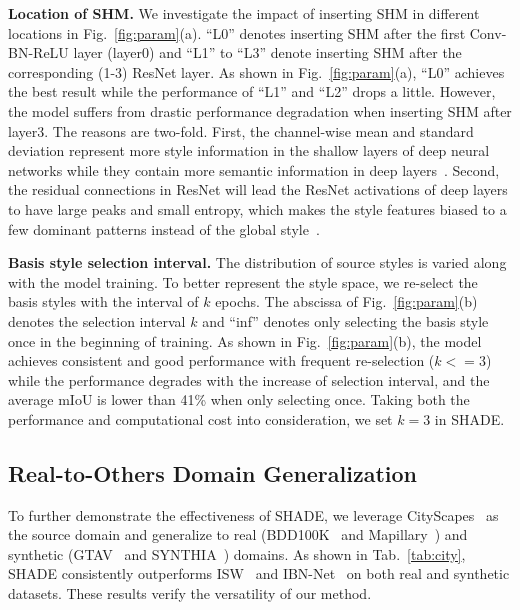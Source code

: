 \documentclass[runningheads]{llncs}
\newcommand{\ours}{SHADE\xspace}
\begin{document}
\noindent\textbf{Location of SHM.}
We investigate the impact of inserting SHM in different locations in Fig.~\ref{fig:param}(a). ``L0'' denotes inserting SHM after the first Conv-BN-ReLU layer (layer0) and ``L1'' to ``L3'' denote inserting SHM after the corresponding (1-3) ResNet layer. As shown in Fig.~\ref{fig:param}(a), ``L0'' achieves the best result while the performance of ``L1'' and ``L2'' drops a little. However, the model suffers from drastic performance degradation when inserting SHM after layer3. The reasons are two-fold. First, the channel-wise mean and standard deviation represent more style information in the shallow layers of deep neural networks while they contain more semantic information in deep layers~\cite{adain,dumoulin2016learned}. Second, the residual connections in ResNet will lead the ResNet activations of deep layers to have large peaks and small entropy, which makes the style features biased to a few dominant patterns instead of the global style~\cite{wang2021rethinking}.


\noindent\textbf{Basis style selection interval.}
The distribution of source styles is varied along with the model training. To better represent the style space, we re-select the basis styles with the interval of $k$ epochs. 
The abscissa of Fig.~\ref{fig:param}(b) denotes the selection interval $k$ and ``inf'' denotes only selecting the basis style once in the beginning of training.
As shown in Fig.~\ref{fig:param}(b), the model achieves consistent and good performance with frequent re-selection ($k<=3$) while the performance degrades with the increase of selection interval, and the average mIoU is lower than 41\% when only selecting once. Taking both the performance and computational cost into consideration, we set $k=3$ in \ours.


\subsection{Real-to-Others Domain Generalization}
To further demonstrate the effectiveness of \ours, we leverage CityScapes~\cite{cityscapes} as the source domain and generalize to real (BDD100K~\cite{bdd} and Mapillary~\cite{mapillary}) and synthetic (GTAV~\cite{gtav} and SYNTHIA~\cite{synthia}) domains.
As shown in Tab.~\ref{tab:city}, \ours consistently outperforms ISW~\cite{robustnet} and IBN-Net~\cite{ibn} on both real and synthetic datasets. These results verify the versatility of our method.
\end{document}
